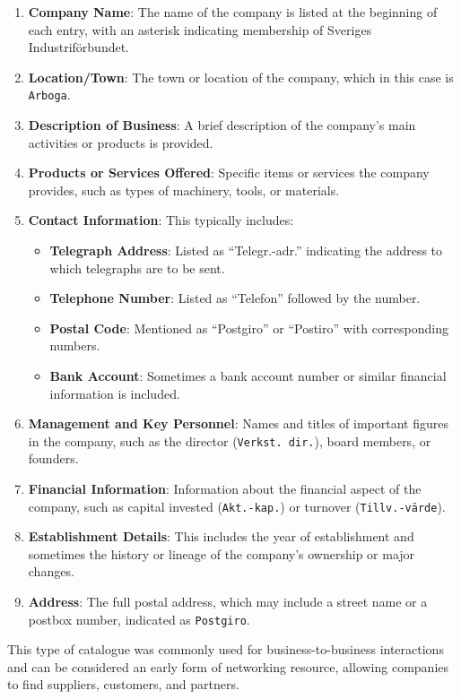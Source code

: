 \documentclass[
]{article}
\providecommand{\tightlist}{%
  \setlength{\itemsep}{0pt}\setlength{\parskip}{0pt}}\usepackage{longtable,booktabs,array}
\begin{document}
\begin{enumerate}
\def\labelenumi{\arabic{enumi}.}
\item
  \textbf{Company Name}: The name of the company is listed at the
  beginning of each entry, with an asterisk indicating membership of
  Sveriges Industriförbundet.
\item
  \textbf{Location/Town}: The town or location of the company, which in
  this case is \texttt{Arboga}.
\item
  \textbf{Description of Business}: A brief description of the company's
  main activities or products is provided.
\item
  \textbf{Products or Services Offered}: Specific items or services the
  company provides, such as types of machinery, tools, or materials.
\item
  \textbf{Contact Information}: This typically includes:

  \begin{itemize}
  \tightlist
  \item
    \textbf{Telegraph Address}: Listed as ``Telegr.-adr.'' indicating
    the address to which telegraphs are to be sent.
  \item
    \textbf{Telephone Number}: Listed as ``Telefon'' followed by the
    number.
  \item
    \textbf{Postal Code}: Mentioned as ``Postgiro'' or ``Postiro'' with
    corresponding numbers.
  \item
    \textbf{Bank Account}: Sometimes a bank account number or similar
    financial information is included.
  \end{itemize}
\item
  \textbf{Management and Key Personnel}: Names and titles of important
  figures in the company, such as the director (\texttt{Verkst.\ dir.}),
  board members, or founders.
\item
  \textbf{Financial Information}: Information about the financial aspect
  of the company, such as capital invested (\texttt{Akt.-kap.}) or
  turnover (\texttt{Tillv.-värde}).
\item
  \textbf{Establishment Details}: This includes the year of
  establishment and sometimes the history or lineage of the company's
  ownership or major changes.
\item
  \textbf{Address}: The full postal address, which may include a street
  name or a postbox number, indicated as \texttt{Postgiro}.
\end{enumerate}

This type of catalogue was commonly used for business-to-business
interactions and can be considered an early form of networking resource,
allowing companies to find suppliers, customers, and partners.
\end{document}
